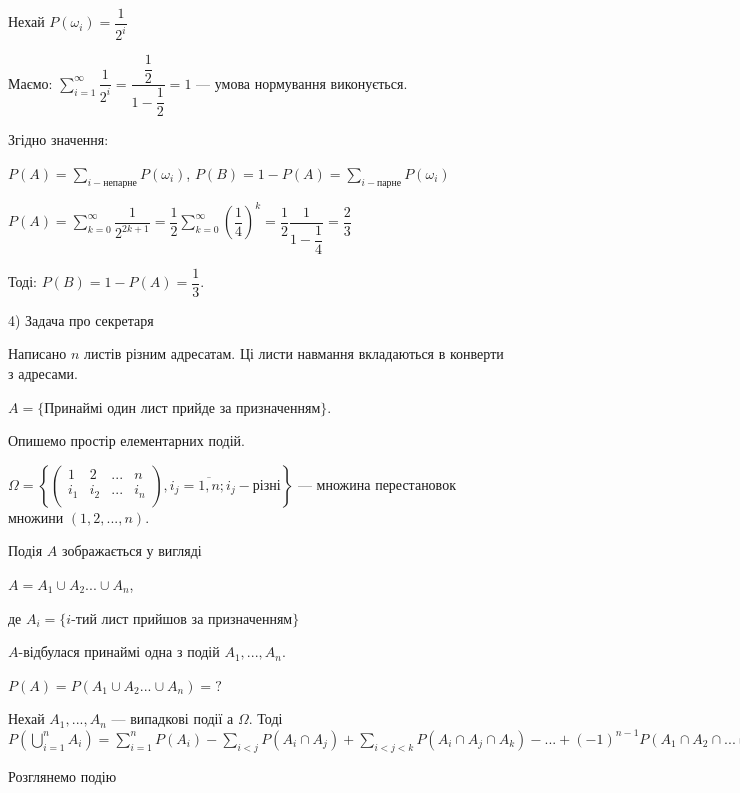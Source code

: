 \begin{example}
    Нехай $P(\omega_i) = \dfrac{1}{2^i}$

    Маємо: $\sum\limits_{i=1}^{\infty} \dfrac{1}{2^i}
    = \dfrac{\dfrac{1}{2}}{1 - \dfrac{1}{2}} = 1$ --- умова
    нормування виконується.

    Згідно значення:

    $P(A) = \sum\limits_{i-\text{непарне}} P(\omega_i)$,
    $P(B) = 1 - P(A) = \sum\limits_{i-\text{парне}} P(\omega_i)$

    $P(A) = \sum\limits_{k=0}^{\infty} \dfrac{1}{2^{2k+1}}
    = \dfrac{1}{2} \sum\limits_{k=0}^{\infty} (\dfrac{1}{4})^k
    = \dfrac{1}{2} \dfrac{1}{1 - \dfrac{1}{4}} = \dfrac{2}{3}$

    Тоді: $P(B) = 1 - P(A) = \dfrac{1}{3}$.

    4) Задача про секретаря

    Написано $n$ листів різним адресатам. Ці листи навмання
    вкладаються в конверти з адресами.

    $A = \{$Принаймі один лист прийде за призначенням$\}$.

    Опишемо простір елементарних подій.

    $\Omega = \left\{ \begin{pmatrix}
        1 & 2 & ... & n \\
        i_1 & i_2 & ... & i_n \\
    \end{pmatrix}, i_j = \overline{1,n}; i_j - \text{різні} \right\}$
    --- множина перестановок множини $(1, 2, ..., n)$.

    Подія $A$ зображається у вигляді
    
    $A = A_1 \cup A_2 ... \cup A_n$,

    де $A_i = \{i$-тий лист прийшов за призначенням$\}$

    $A$-відбулася принаймі одна з подій $A_1, ..., A_n$.

    $P(A) = P(A_1 \cup A_2 ... \cup A_n) = ?$
\end{example}

\begin{lemma}
    Нехай $A_1, ..., A_n$ --- випадкові події а $\Omega$. Тоді
    $P(\bigcup\limits_{i=1}^n A_i)
    = \sum\limits_{i=1}^n P(A_i)
        - \sum\limits_{i<j} P(A_i \cap A_j)
        + \sum\limits_{i<j<k} P(A_i \cap A_j \cap A_k) - ...
        + (-1)^{n-1} P(A_1 \cap A_2 \cap ... \cap A_n)$
\end{lemma}

Розглянемо подію 

